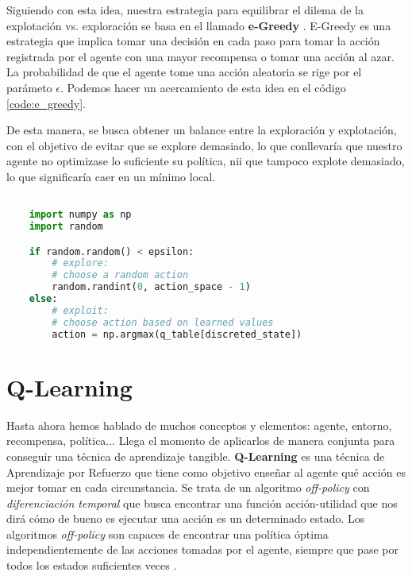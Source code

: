 Siguiendo con esta idea, nuestra estrategia para equilibrar el dilema de la explotación vs. exploración se basa en el llamado \textbf{e-Greedy} \citep{Tokic:egreedy}. E-Greedy es una estrategia que implica tomar una decisión en cada paso para tomar la acción registrada por el agente con una mayor recompensa o tomar una acción al azar. La probabilidad de que el agente tome una acción aleatoria se rige por el parámeto \( \epsilon \). Podemos hacer un acercamiento de esta idea en el código \ref{code:e_greedy}.

De esta manera, se busca obtener un balance entre la exploración y explotación, con el objetivo de evitar que se explore demasiado, lo que conllevaría que nuestro agente no optimizase lo suficiente su política, nii que tampoco explote demasiado, lo que significaría caer en un mínimo local.

\begin{minipage}{0.9\linewidth}%
    \begin{lstlisting}[frame=tb, language=Python, caption=Pseudocódigo e-Greedy, label={code:e_greedy}]

    import numpy as np
    import random

    if random.random() < epsilon:
        # explore:
        # choose a random action
        random.randint(0, action_space - 1)
    else:
        # exploit:
        # choose action based on learned values
        action = np.argmax(q_table[discreted_state])
    \end{lstlisting}%
\end{minipage}

\section{Q-Learning}

Hasta ahora hemos hablado de muchos conceptos y elementos: agente, entorno, recompensa, política... Llega el momento de aplicarlos de manera conjunta para conseguir una técnica de aprendizaje tangible. \textbf{Q-Learning} es una técnica de Aprendizaje por Refuerzo que tiene como objetivo enseñar al agente qué acción es mejor tomar en cada circunstancia. Se trata de un algoritmo \textit{off-policy} con \textit{diferenciación temporal} que busca encontrar una función acción-utilidad que nos dirá cómo de bueno es ejecutar una acción es un determinado estado. Los algoritmos \textit{off-policy} son capaces de encontrar una política óptima independientemente de las acciones tomadas por el agente, siempre que pase por todos los estados suficientes veces \citep{PooleMackworth17}.

